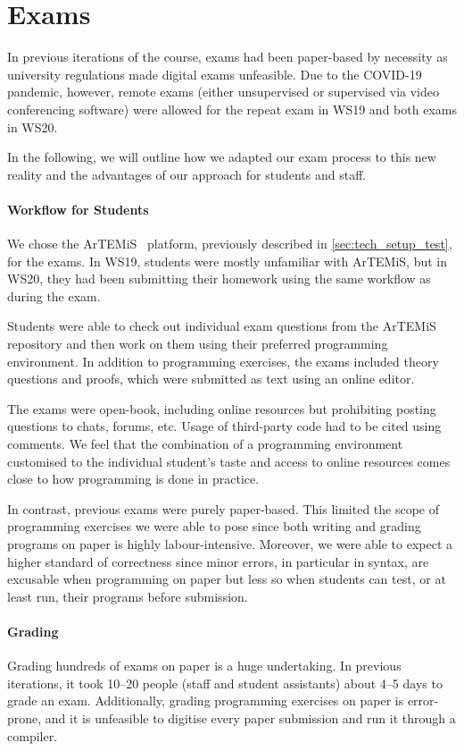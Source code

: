 \section{Exams}\label{sec:exam}
In previous iterations of the course, exams had been paper-based by necessity as university regulations made digital exams unfeasible.
Due to the COVID-19 pandemic, however, remote exams (either unsupervised or supervised via video conferencing software) were allowed for the repeat exam in WS19 and both exams in WS20.

In the following, we will outline how we adapted our exam process to this new reality and the advantages of our approach for students and staff.

\paragraph{Workflow for Students}

We chose the ArTEMiS~\cite{artemis} platform, previously described in \cref{sec:tech_setup_test}, for the exams.
In WS19, students were mostly unfamiliar with ArTEMiS,
but in WS20, they had been submitting their homework using the same workflow as during the exam.

Students were able to check out individual exam questions from the ArTEMiS repository and then work on them using their preferred programming environment.
In addition to programming exercises, the exams included theory questions and proofs, which were submitted as text using an online editor.

The exams were open-book, including online resources
but prohibiting posting questions to chats, forums, etc.
Usage of third-party code had to be cited using comments.
We feel that the combination of a programming environment customised to the individual student's taste and access to online resources comes close to how programming is done in practice.

In contrast, previous exams were purely paper-based.
This limited the scope of programming exercises we were able to pose
since both writing and grading programs on paper is highly labour-intensive.
Moreover, we were able to expect a higher standard of correctness
since minor errors, in particular in syntax, are excusable when programming on paper but less so when students can test, or at least run, their programs before submission.

\paragraph{Grading}
Grading hundreds of exams on paper is a huge undertaking.
In previous iterations,
it took 10--20 people (staff and student assistants) about 4--5 days to grade an exam.
Additionally, grading programming exercises on paper is error-prone, and it is unfeasible to digitise every paper submission and run it through a compiler.

